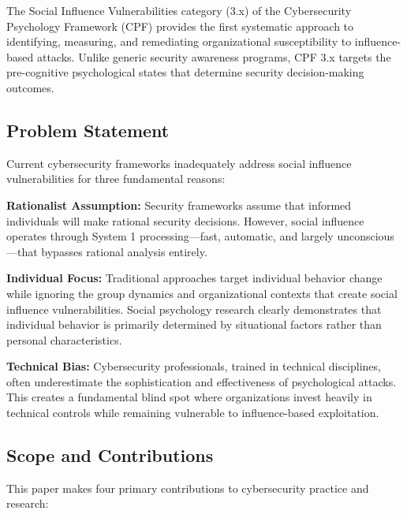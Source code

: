 \documentclass[11pt,a4paper]{article}
\begin{document}
The Social Influence Vulnerabilities category (3.x) of the Cybersecurity Psychology Framework (CPF) provides the first systematic approach to identifying, measuring, and remediating organizational susceptibility to influence-based attacks. Unlike generic security awareness programs, CPF 3.x targets the pre-cognitive psychological states that determine security decision-making outcomes.

\subsection{Problem Statement}

Current cybersecurity frameworks inadequately address social influence vulnerabilities for three fundamental reasons:

\textbf{Rationalist Assumption:} Security frameworks assume that informed individuals will make rational security decisions. However, social influence operates through System 1 processing\cite{kahneman2011}—fast, automatic, and largely unconscious—that bypasses rational analysis entirely.

\textbf{Individual Focus:} Traditional approaches target individual behavior change while ignoring the group dynamics and organizational contexts that create social influence vulnerabilities. Social psychology research clearly demonstrates that individual behavior is primarily determined by situational factors rather than personal characteristics\cite{ross1977}.

\textbf{Technical Bias:} Cybersecurity professionals, trained in technical disciplines, often underestimate the sophistication and effectiveness of psychological attacks. This creates a fundamental blind spot where organizations invest heavily in technical controls while remaining vulnerable to influence-based exploitation.

\subsection{Scope and Contributions}

This paper makes four primary contributions to cybersecurity practice and research:
\end{document}

